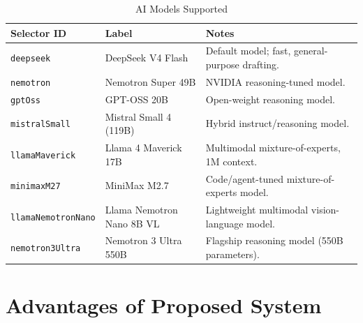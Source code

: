 \documentclass[12pt,a4paper]{article}
\begin{document}
\begin{table}[h]
\centering
\caption{AI Models Supported}
\begin{tabularx}{\textwidth}{@{}l X X@{}}
\toprule
\textbf{Selector ID} & \textbf{Label} & \textbf{Notes} \\
\midrule
\texttt{deepseek}            & DeepSeek V4 Flash             & Default model; fast, general-purpose drafting. \\
\texttt{nemotron}            & Nemotron Super 49B            & NVIDIA reasoning-tuned model. \\
\texttt{gptOss}              & GPT-OSS 20B                   & Open-weight reasoning model. \\
\texttt{mistralSmall}        & Mistral Small 4 (119B)        & Hybrid instruct/reasoning model. \\
\texttt{llamaMaverick}       & Llama 4 Maverick 17B          & Multimodal mixture-of-experts, 1M context. \\
\texttt{minimaxM27}          & MiniMax M2.7                  & Code/agent-tuned mixture-of-experts model. \\
\texttt{llamaNemotronNano}   & Llama Nemotron Nano 8B VL     & Lightweight multimodal vision-language model. \\
\texttt{nemotron3Ultra}      & Nemotron 3 Ultra 550B         & Flagship reasoning model (550B parameters). \\
\bottomrule
\end{tabularx}
\end{table}

\section{Advantages of Proposed System}
\end{document}
